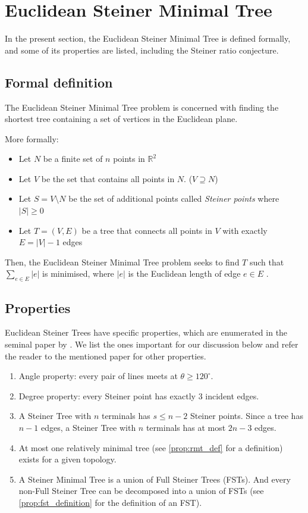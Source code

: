 \documentclass{l4proj}
\begin{document}
\section{Euclidean Steiner Minimal Tree}
In the present section, the Euclidean Steiner Minimal Tree is defined formally, and some of its properties are listed, including the Steiner ratio conjecture.
\subsection{Formal definition}
\label{sec:esmt_definition}
The Euclidean Steiner Minimal Tree problem is concerned with finding the shortest tree containing a set of vertices in the Euclidean plane.

More formally:
\begin{itemize}
    \item Let $N$ be a finite set of $n$ points in $\mathbb{R}^2$
    \item Let $V$ be the set that contains all points in $N$. ($V \supseteq N$)
    \item Let $S = V \setminus N$ be the set of additional points called \textit{Steiner points} where $|S| \geq 0$
    \item Let $T = (V, E)$ be a tree that connects all points in $V$ with exactly $E = |V| - 1$ edges
\end{itemize}

Then, the Euclidean Steiner Minimal Tree problem seeks to find $T$ such that $\sum_{e \in E} |e|$ is minimised, where $|e|$ is the Euclidean length of edge $e \in E$ \citep{Brazil2015}.

\subsection{Properties}
\label{sec:esmt_properties}
Euclidean Steiner Trees have specific properties, which are enumerated in the seminal paper by \cite{Gilbert1968SteinerMT}. We list the ones important for our discussion below and refer the reader to the mentioned paper for other properties.

\begin{enumerate}
    \item Angle property: every pair of lines meets at $\theta \geq 120^\circ$.
    \item Degree property: every Steiner point has exactly 3 incident edges.
    \item \label{prop:esmt_fst} A Steiner Tree with $n$ terminals has $s \leq n - 2$ Steiner points. Since a tree has $n - 1$ edges, a Steiner Tree with $n$ terminals has at most $2n - 3$ edges.
    \item At most one relatively minimal tree (see \ref{prop:rmt_def} for a definition) exists for a given topology.
    \item \label{prop:smt_fst} A Steiner Minimal Tree is a union of Full Steiner Trees (FSTs). And every non-Full Steiner Tree can be decomposed into a union of FSTs (see \ref{prop:fst_definition} for the definition of an FST).
\end{enumerate}
\end{document}
